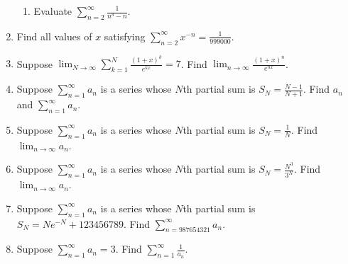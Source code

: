 \documentclass[11pt]{article}
\begin{document}
\begin{enumerate}
\begin{enumerate}
    \item Evaluate $\displaystyle \sum_{n=2}^\infty \frac1{n^3-n}$.

  \end{enumerate}

  \item Find all values of $x$ satisfying $\displaystyle \sum_{n=2}^\infty
  x^{-n} = \frac1{999000}$.

  \item Suppose
  $\displaystyle\lim_{N\to\infty}\sum_{k=1}^N\frac{(1+x)^k}{e^{kx}}=7$. Find
  $\displaystyle\lim_{n\to\infty}\frac{(1+x)^n}{e^{nx}}$.

  \item Suppose $\displaystyle\sum_{n=1}^\infty a_n$ is a series whose $N$th
  partial sum is $\displaystyle S_N=\frac{N-1}{N+1}$. Find
  $a_n$ and $\displaystyle\sum_{n=1}^\infty a_n$.

  \item Suppose $\displaystyle\sum_{n=1}^\infty a_n$ is a series whose $N$th
  partial sum is $\displaystyle S_N=\frac1N$. Find
  $\displaystyle\lim_{n\to\infty}a_n$.

  \item Suppose $\displaystyle\sum_{n=1}^\infty a_n$ is a series whose $N$th
  partial sum is $\displaystyle S_N=\frac{N^3}{3^N}$. Find
  $\displaystyle\lim_{n\to\infty}a_n$.

  \item Suppose $\displaystyle\sum_{n=1}^\infty a_n$ is a series whose $N$th
  partial sum is $\displaystyle S_N=Ne^{-N}+123456789$. Find
  $\displaystyle\sum_{n=987654321}^\infty a_n$.

  \item Suppose $\displaystyle\sum_{n=1}^\infty a_n=3$. Find
  $\displaystyle\sum_{n=1}^\infty\frac1{a_n}$.

\end{enumerate}
\end{document}
